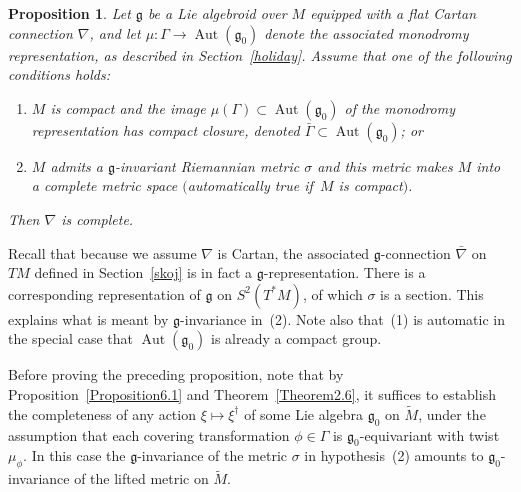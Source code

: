 \documentclass[pdftex]{sigma}
\DeclareMathOperator{\automorphism}{Aut}
\numberwithin{equation}{section}
\newtheorem{PropositionBlaom}[TheoremBlaom]{Proposition}
 { \theoremstyle{definition}
\newtheorem{CounterexampleBlaom}[TheoremBlaom]{Counterexample}
\newtheorem{RemarkBlaom}[TheoremBlaom]{Remark} }
\begin{document}
 \begin{PropositionBlaom}\label{Proposition6.2}
   Let ${\mathfrak g} $ be a Lie algebroid over $M$ equipped with a
   flat Cartan connection $\nabla$, and let $\mu \colon \Gamma
   \rightarrow \automorphism({\mathfrak g}_0)$ denote the associated
   monodromy representation, as described in Section~{\rm \ref{holiday}}. Assume
   that one of the following conditions holds:
 \begin{enumerate}\itemsep=0pt
 \item[$(1)$] $M$ is compact and the image $\mu(\Gamma)\subset
   \automorphism({\mathfrak g}_0)$ of the monodromy representation has
   compact closure, denoted $\bar \Gamma \subset
   \automorphism({\mathfrak g}_0)$; or %
 \item[$(2)$] $M$ admits a ${\mathfrak g}$-invariant Riemannian metric
   $\sigma$ and this metric makes $M$ into a complete metric space
   $($automatically true if~$M$ is compact$)$.%
 \end{enumerate}
 Then $\nabla $ is complete.
\end{PropositionBlaom}

Recall that because we assume $\nabla $ is Cartan, the
associated ${\mathfrak g}$-connection $\bar\nabla$ on $TM$ def\/ined in
Section~\ref{skoj} is in fact a $\mathfrak g$-representation. There is a
corresponding representation of ${\mathfrak g} $ on $S^2(T^*\!M)$, of
which $\sigma$ is a section. This explains what is meant by $\mathfrak
g$-invariance in~(2). Note also that~(1) is automatic in
the special case that $\automorphism({\mathfrak g}_0)$ is already a
compact group.

Before proving the preceding proposition, note that by Proposition~\ref{Proposition6.1} %
and Theorem~\ref{Theorem2.6}, it suf\/f\/ices to
establish the completeness of any action $\xi \mapsto \xi^\dagger$ of
some Lie algebra ${\mathfrak g}_0 $ on $\tilde M$, under the assumption
that each covering transformation $\phi \in \Gamma$ is ${\mathfrak
  g}_0$-equivariant with twist $\mu_\phi$. In this case the
${\mathfrak g}$-invariance of the metric $\sigma $ in hypothesis~(2) %
amounts to ${\mathfrak g}_0$-invariance of the lifted
metric on $\tilde M$.
\end{document}
